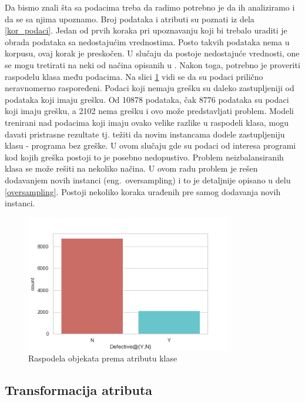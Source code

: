 \documentclass[12pt,oneside]{memoir}
\begin{document}
Da bismo znali šta sa podacima treba da radimo potrebno je da ih analiziramo i da se sa njima upoznamo. Broj podataka i atributi su poznati iz dela \ref{kor_podaci}. Jedan od prvih koraka pri upoznavanju koji bi trebalo uraditi je obrada podataka sa nedostajućim vrednostima. Posto takvih podataka nema u korpusu, ovaj korak je preskočen. U slučaju da postoje nedostajuće vrednosti, one se mogu tretirati na neki od načina opisanih u \cite{mitic}. Nakon toga, potrebno je proveriti raspodelu klasa među podacima. Na slici \ref{fig:raspodela} vidi se da su podaci prilično neravnomerno raspoređeni. Podaci koji nemaju grešku su daleko zastupljeniji od podataka koji imaju grešku. Od 10878 podataka, čak 8776 podataka su podaci koji imaju grešku, a 2102 nema grešku i ovo može predstavljati problem. Modeli trenirani nad podacima koji imaju ovako velike razlike u raspodeli klasa, mogu davati pristrasne rezultate tj. težiti da novim instancama dodele zastupljeniju klasu - programa bez greške. U ovom slučaju gde su podaci od interesa programi kod kojih greška postoji to je posebno nedopustivo. Problem neizbalansiranih klasa se može rešiti na nekoliko načina. U ovom radu problem je rešen dodavanjem novih instanci (eng.~oversampling) i to je detaljnije opisano u delu \ref{oversampling}. Postoji nekoliko koraka urađenih pre samog dodavanja novih instanci.  

\begin{figure}[!ht]
  \centering
  \includegraphics[width=0.80\textwidth]{raspodela.png}
  \caption{Raspodela objekata prema atributu klase}
  \label{fig:raspodela}
\end{figure}

%			 
\subsection{Transformacija atributa}
\end{document}
